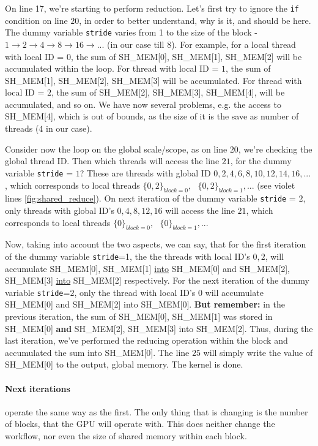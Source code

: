 \documentclass[12pt]{article}
\begin{document}
On line 17, we're starting to perform reduction. Let's first try to ignore the \verb|if| 
condition on line $20$, in order to better understand, why is it, and should be here. The 
dummy variable \verb|stride| varies from 1 to the size of the block -
$1\to 2\to 4\to 8\to 16 \to ...$ (in our case till $8$).%
For example, for a local thread with local ID = $0$, the sum of SH\_MEM[0], SH\_MEM[1], SH\_MEM[2] will be accumulated 
within the loop. For thread with local ID = $1$, the sum of SH\_MEM[1], SH\_MEM[2], SH\_MEM[3] will be accumulated. For
thread with local ID = $2$, the sum of SH\_MEM[2], SH\_MEM[3], SH\_MEM[4], will be accumulated, and so on. 
We have now several problems, e.g. the access to SH\_MEM[4], which is out of bounds, as the size of it is the 
save as number of threads ($4$ in our case). 

Consider now the loop on the global scale/scope, as on line $20$, 
we're checking the global thread ID. Then which threads will access the line $21$, for the dummy variable \verb|stride| = $1$? 
These are threads with global ID $0,2,4,6,8,10,12,14,16, ... $, which corresponds to local threads
$\{0,2\}_{block=0},\text{ }\{0,2\}_{block=1}, ...$ (see violet lines \autoref{fig:shared_reduce}). 
On next iteration of the dummy variable \verb|stride| = $2$, only threads with global 
ID's $0,4,8,12,16$ will access the line $21$, which corresponds to local threads $\{0\}_{block=0},\text{ }\{0\}_{block=1}, ...$

Now, taking into account the two aspects, we can say, that for the first iteration of the dummy variable \verb|stride|=1, the 
the threads with local ID's $0,2$, will accumulate SH\_MEM[0], SH\_MEM[1] \underline{into} 
SH\_MEM[0] and SH\_MEM[2], SH\_MEM[3] \underline{into} SH\_MEM[2] respectively. 
For the next iteration of the dummy variable \verb|stride|=$2$, only the thread with local ID's $0$ 
will accumulate SH\_MEM[0] and SH\_MEM[2] into SH\_MEM[0]. \textbf{But remember: } in the previous iteration, 
the sum of SH\_MEM[0], SH\_MEM[1] was stored in SH\_MEM[0] \textbf{and} SH\_MEM[2], SH\_MEM[3] into SH\_MEM[2]. 
Thus, during the last iteration, we've performed the reducing operation within the block and accumulated the sum into SH\_MEM[0]. 
The line $25$ will simply write the value of SH\_MEM[0] to the output, global memory.  The kernel is done. 

\paragraph*{Next iterations} operate the same way as the first. The only thing that is changing is the number 
of blocks, that the GPU will operate with. This does neither change the workflow, nor even the size of 
shared memory within each block. 
\end{document}
